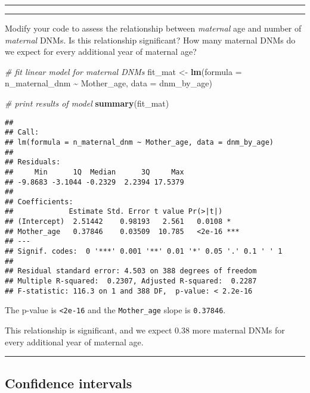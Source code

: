 \documentclass[
]{article}
\newenvironment{Shaded}{\begin{snugshade}}{\end{snugshade}}
\newcommand{\AttributeTok}[1]{\textcolor[rgb]{0.13,0.29,0.53}{#1}}
\newcommand{\CommentTok}[1]{\textcolor[rgb]{0.56,0.35,0.01}{\textit{#1}}}
\newcommand{\FunctionTok}[1]{\textcolor[rgb]{0.13,0.29,0.53}{\textbf{#1}}}
\newcommand{\NormalTok}[1]{#1}
\newcommand{\OtherTok}[1]{\textcolor[rgb]{0.56,0.35,0.01}{#1}}
\newcommand{\SpecialCharTok}[1]{\textcolor[rgb]{0.81,0.36,0.00}{\textbf{#1}}}
\begin{document}
\begin{center}\rule{0.5\linewidth}{0.5pt}\end{center}

\begin{center}\rule{0.5\linewidth}{0.5pt}\end{center}

Modify your code to assess the relationship between \emph{maternal} age
and number of \emph{maternal} DNMs. Is this relationship significant?
How many maternal DNMs do we expect for every additional year of
maternal age?

\begin{Shaded}
\begin{Highlighting}[]
\CommentTok{\# fit linear model for maternal DNMs}
\NormalTok{fit\_mat }\OtherTok{\textless{}{-}} \FunctionTok{lm}\NormalTok{(}\AttributeTok{formula =}\NormalTok{ n\_maternal\_dnm }\SpecialCharTok{\textasciitilde{}}\NormalTok{ Mother\_age,}
              \AttributeTok{data =}\NormalTok{ dnm\_by\_age)}

\CommentTok{\# print results of model}
\FunctionTok{summary}\NormalTok{(fit\_mat)}
\end{Highlighting}
\end{Shaded}

\begin{verbatim}
## 
## Call:
## lm(formula = n_maternal_dnm ~ Mother_age, data = dnm_by_age)
## 
## Residuals:
##     Min      1Q  Median      3Q     Max 
## -9.8683 -3.1044 -0.2329  2.2394 17.5379 
## 
## Coefficients:
##             Estimate Std. Error t value Pr(>|t|)    
## (Intercept)  2.51442    0.98193   2.561   0.0108 *  
## Mother_age   0.37846    0.03509  10.785   <2e-16 ***
## ---
## Signif. codes:  0 '***' 0.001 '**' 0.01 '*' 0.05 '.' 0.1 ' ' 1
## 
## Residual standard error: 4.503 on 388 degrees of freedom
## Multiple R-squared:  0.2307, Adjusted R-squared:  0.2287 
## F-statistic: 116.3 on 1 and 388 DF,  p-value: < 2.2e-16
\end{verbatim}

The p-value is \texttt{\textless{}2e-16} and the \texttt{Mother\_age}
slope is \texttt{0.37846}.

This relationship is significant, and we expect 0.38 more maternal DNMs
for every additional year of maternal age.

\begin{center}\rule{0.5\linewidth}{0.5pt}\end{center}

\subsection{Confidence intervals}\label{confidence-intervals}
\end{document}
